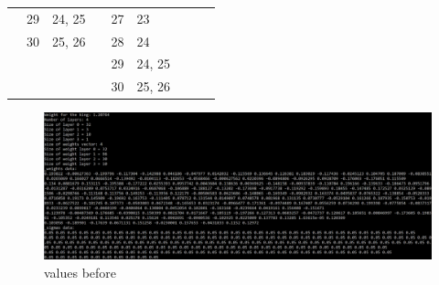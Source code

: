 \documentclass{article}
\begin{document}
\begin{table}[]
\begin{tabular}{|lllllllll|}
\multicolumn{1}{|l|}{\cellcolor[HTML]{C0C0C0}} & \multicolumn{1}{l|}{29}            & \multicolumn{1}{l|}{24, 25}      & \multicolumn{1}{l|}{\cellcolor[HTML]{C0C0C0}} & 27                                 & \multicolumn{1}{l|}{23}                & \cellcolor[HTML]{C0C0C0}                      & \cellcolor[HTML]{C0C0C0}           & \cellcolor[HTML]{C0C0C0} \\
\multicolumn{1}{|l|}{\cellcolor[HTML]{C0C0C0}} & \multicolumn{1}{l|}{30}            & \multicolumn{1}{l|}{25, 26}      & \multicolumn{1}{l|}{\cellcolor[HTML]{C0C0C0}} & 28                                 & \multicolumn{1}{l|}{24}                & \cellcolor[HTML]{C0C0C0}                      & \cellcolor[HTML]{C0C0C0}           & \cellcolor[HTML]{C0C0C0} \\ \cline{2-3}
\cellcolor[HTML]{C0C0C0}                       & \cellcolor[HTML]{C0C0C0}           & \cellcolor[HTML]{C0C0C0}         & \multicolumn{1}{l|}{\cellcolor[HTML]{C0C0C0}} & 29                                 & \multicolumn{1}{l|}{24, 25}            & \cellcolor[HTML]{C0C0C0}                      & \cellcolor[HTML]{C0C0C0}           & \cellcolor[HTML]{C0C0C0} \\
\cellcolor[HTML]{C0C0C0}                       & \cellcolor[HTML]{C0C0C0}           & \cellcolor[HTML]{C0C0C0}         & \multicolumn{1}{l|}{\cellcolor[HTML]{C0C0C0}} & 30                                 & \multicolumn{1}{l|}{25, 26}            & \cellcolor[HTML]{C0C0C0}                      & \cellcolor[HTML]{C0C0C0}           & \cellcolor[HTML]{C0C0C0} \\ \hline
\end{tabular}
\end{table}

\begin{figure}
    \includegraphics[width=\linewidth]{images/3-10-1-before.png}
    \caption{values before}
    \label{fig:3-10-1-before}
\end{figure}
\end{document}
